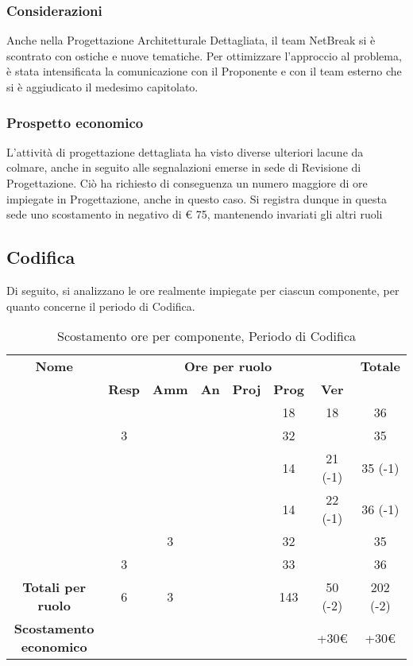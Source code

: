 \subsubsection{Considerazioni}
Anche nella Progettazione Architetturale Dettagliata, il team NetBreak si è scontrato con ostiche e nuove tematiche. Per ottimizzare l'approccio al problema, è stata intensificata la comunicazione con il Proponente e con il team esterno che si è aggiudicato il medesimo capitolato.

\subsubsection{Prospetto economico}
L'attività di progettazione dettagliata ha visto diverse ulteriori lacune da colmare, anche in seguito alle segnalazioni emerse in sede di Revisione di Progettazione. Ciò ha richiesto di conseguenza un numero maggiore di ore impiegate in Progettazione, anche in questo caso. Si registra dunque in questa sede uno scostamento in negativo di € 75, mantenendo invariati gli altri ruoli

\newpage
\subsection{Codifica}

Di seguito, si analizzano le ore realmente impiegate per ciascun componente, per quanto concerne il periodo di Codifica.

\begin{table}[H]
	\begin{center}
		\begin{tabular}{|c|c|c|c|c|c|c|c|}
			\hline
			\textbf{Nome} & \multicolumn{6}{c|}{\textbf{Ore per ruolo}} & \textbf{Totale} \\\cline{2-7}
			& \textbf{Resp} & \textbf{Amm} & \textbf{An} & \textbf{Proj} & \textbf{Prog} & \textbf{Ver} & \\
			\hline
			\MC			&		&		&		&		&	18	&	18	&	36	\\
			\hline
			\AN			&	3	&		&		&	 	&	32	&		& 	35	\\
			\hline
			\DAN		&		&		&		&		&	14	&	21 (-1)	&	35 (-1)	\\
			\hline
			\AS			&		&	 	&	 	&		&	14 	& 	22 (-1)	&	36	(-1)\\
			\hline
			\NS 		&		&	3	&		&		&	32	& 		&	35	\\
			\hline
			\DS			& 	3	&		&		&		&	33	&		&	36	\\
			\hline
			\textbf{Totali per ruolo}	& 	6 	&	3 	&		&		&	143	&	50 (-2) 	&	202 (-2)	\\
			\hline
			\textbf{Scostamento economico}	& 		&		&		&		&		&	+30€	&	+30€	\\
			\hline
		\end{tabular}
	\end{center}
	\caption{Scostamento ore per componente, Periodo di Codifica}
\end{table}


